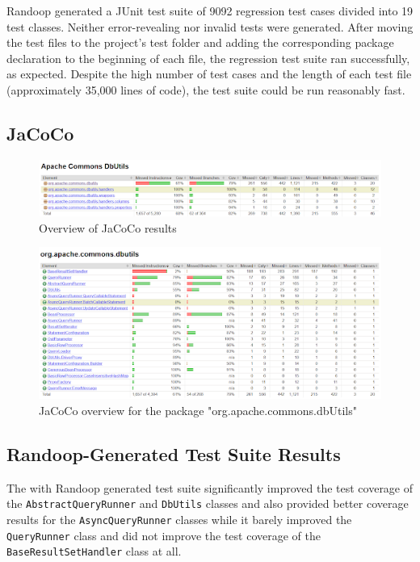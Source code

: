 \documentclass[sigconf]{acmart}
\begin{document}
Randoop generated a JUnit test suite of 9092 regression test cases divided into 19 test classes. Neither error-revealing nor invalid tests were generated. After moving the test files to the project’s test folder and adding the corresponding package declaration to the beginning of each file, the regression test suite ran successfully, as expected. Despite the high number of test cases and the length of each test file (approximately 35,000 lines of code), the test suite could be run reasonably fast.

\subsection*{JaCoCo}

\begin{figure}[H]
    \centering
    \includegraphics[width=1\linewidth]{images/randoop1.png}
    \caption{Overview of JaCoCo results}
\end{figure}

\begin{figure}[H]
    \centering
    \includegraphics[width=1\linewidth]{images/randoop2.png}
    \caption{JaCoCo overview for the package "org.apache.commons.dbUtils"}
\end{figure}

\subsection*{Randoop-Generated Test Suite Results}

The with Randoop generated test suite significantly improved the test coverage of the \texttt{AbstractQueryRunner} and \texttt{DbUtils} classes and also provided better coverage results for the \texttt{AsyncQueryRunner} classes while it barely improved the \texttt{QueryRunner} class and did not improve the test coverage of the \texttt{BaseResultSetHandler} class at all.
\end{document}
